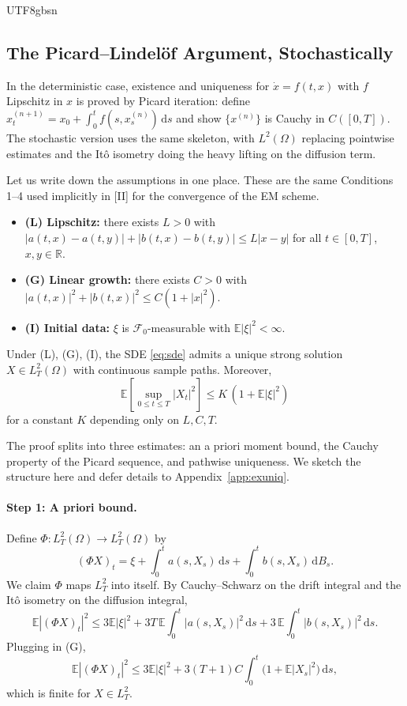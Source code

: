\documentclass{article}
\begin{document}
\begin{CJK*}{UTF8}{gbsn}
\subsection{The Picard--Lindel\"of Argument, Stochastically}

In the deterministic case, existence and uniqueness for $\dot x=f(t,x)$ with $f$ Lipschitz in $x$ is proved by Picard iteration: define $x^{(n+1)}_t=x_0+\int_0^t f(s,x^{(n)}_s)\,\mathrm{d}s$ and show $\{x^{(n)}\}$ is Cauchy in $C([0,T])$. The stochastic version uses the same skeleton, with $L^2(\Omega)$ replacing pointwise estimates and the It\^o isometry doing the heavy lifting on the diffusion term.

Let us write down the assumptions in one place. These are the same Conditions 1--4 used implicitly in [II] for the convergence of the EM scheme.

\begin{itemize}
    \item \textbf{(L) Lipschitz:} there exists $L>0$ with
    $|a(t,x)-a(t,y)|+|b(t,x)-b(t,y)|\le L|x-y|$ for all $t\in[0,T]$, $x,y\in\mathbb{R}$.
    \item \textbf{(G) Linear growth:} there exists $C>0$ with
    $|a(t,x)|^2+|b(t,x)|^2\le C(1+|x|^2)$.
    \item \textbf{(I) Initial data:} $\xi$ is $\mathcal{F}_0$-measurable with $\mathbb{E}|\xi|^2<\infty$.
\end{itemize}

\begin{theorem}\label{thm:exuniq}
Under (L), (G), (I), the SDE \eqref{eq:sde} admits a unique strong solution $X\in L^2_T(\Omega)$ with continuous sample paths. Moreover,
\[
  \mathbb{E}\!\left[\sup_{0\le t\le T}|X_t|^2\right]\le K\,(1+\mathbb{E}|\xi|^2)
\]
for a constant $K$ depending only on $L,C,T$.
\end{theorem}

The proof splits into three estimates: an a priori moment bound, the Cauchy property of the Picard sequence, and pathwise uniqueness. We sketch the structure here and defer details to Appendix~\ref{app:exuniq}.

\paragraph{Step 1: A priori bound.} Define $\Phi:L^2_T(\Omega)\to L^2_T(\Omega)$ by
\[
  (\Phi X)_t=\xi+\int_0^t a(s,X_s)\,\mathrm{d}s+\int_0^t b(s,X_s)\,\mathrm{d}B_s.
\]
We claim $\Phi$ maps $L^2_T$ into itself. By Cauchy--Schwarz on the drift integral and the It\^o isometry on the diffusion integral,
\[
  \mathbb{E}|(\Phi X)_t|^2\le 3\mathbb{E}|\xi|^2+3T\,\mathbb{E}\!\int_0^t|a(s,X_s)|^2\,\mathrm{d}s+3\,\mathbb{E}\!\int_0^t|b(s,X_s)|^2\,\mathrm{d}s.
\]
Plugging in (G),
\[
  \mathbb{E}|(\Phi X)_t|^2\le 3\mathbb{E}|\xi|^2+3(T+1)C\!\int_0^t\!\bigl(1+\mathbb{E}|X_s|^2\bigr)\,\mathrm{d}s,
\]
which is finite for $X\in L^2_T$.


\end{CJK*}
\end{document}
